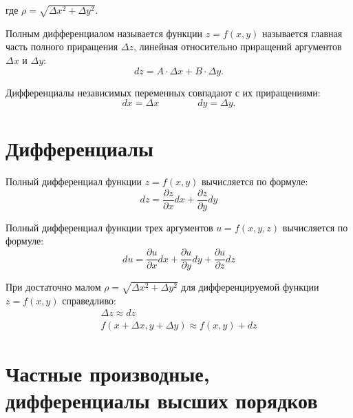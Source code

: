 \documentclass[a4paper,12pt,oneside]{extbook}
\theoremstyle{numbered}
\theoremstyle{unnumbered}
\theoremstyle{named}
\theoremstyle{unnumbered}
\theoremstyle{named}
\theoremstyle{named}
\theoremstyle{named}
\begin{document}
где \(\rho = \sqrt{\Delta x^2 + \Delta y^2}\).

Полным дифференциалом называется функции \(z = f(x, y)\) называется главная часть полного приращения \(\Delta z\), линейная относительно приращений аргументов \(\Delta x\) и \(\Delta y\):
\begin{equation}
    dz = A \cdot \Delta x + B \cdot \Delta y.
\end{equation}

Дифференциалы независимых переменных совпадают с их приращениями:
\begin{equation}
    dx = \Delta x \qquad \qquad dy = \Delta y.
\end{equation}

\section{Дифференциалы}%
\label{sec:Дифференциалы}

Полный дифференциал функции \(z = f(x, y)\) вычисляется по формуле:
\begin{equation}
    dz = \frac{\partial z}{\partial x}dx + \frac{\partial z}{\partial y}dy
\end{equation}

Полный дифференциал функции трех аргументов \(u = f(x, y, z)\) вычисляется по формуле:
\begin{equation}
    du = \frac{\partial u}{\partial x}dx + \frac{\partial u}{\partial y}dy + \frac{\partial u}{\partial z}dz
\end{equation}

При достаточно малом \(\rho = \sqrt{\Delta x^2 + \Delta y^2}\) для дифференцируемой функции \(z = f(x, y)\) справедливо:
\begin{gather}
    \Delta z \approx dz \\
    f(x + \Delta x, y + \Delta y) \approx f(x, y) + dz
\end{gather}

\section{Частные производные, дифференциалы высших порядков}%
\label{sec:Частные производные, дифференциалы высших порядков}
\end{document}
